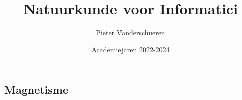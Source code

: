 \documentclass{exam}
\title{Natuurkunde voor Informatici}
\author{Pieter Vanderschueren}
\date{Academiejaren 2022-2024}
\newcommand{\RomanNumeralCaps}[1]{\MakeUppercase{\romannumeral #1}}
\newcommand{\introPage}[1]{

    \vspace*{\fill}
    \begin{center}
        
    \section*{#1}
    \end{center}

    \vspace*{\fill}
}
\begin{document}
\begin{titlingpage}
\maketitle
\end{titlingpage}


\newpage

%
%
%
%
%

\tableofcontents

\newpage





% 






% 




% 




% 


\introPage{Magnetisme}

\newpage


\end{document}
